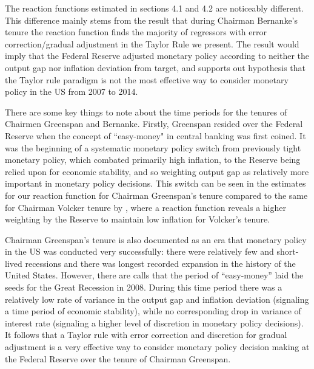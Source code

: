 \documentclass[notitlepage,12pt]{article}
\begin{document}
The reaction functions estimated in sections 4.1 and 4.2 are noticeably different.  This difference mainly stems from the result that during Chairman Bernanke's tenure the reaction function finds the majority of regressors  with error correction/gradual adjustment in the Taylor Rule we present.  The result would imply that the Federal Reserve adjusted monetary policy according to neither the output gap nor inflation deviation from target, and supports out hypothesis that the Taylor rule paradigm is not the most effective way to consider monetary policy in the US from 2007 to 2014.

There are some key things to note about the time periods for the tenures of Chairmen Greenspan and Bernanke.  Firstly, Greenspan resided over the Federal Reserve when the concept of ``easy-money" in central banking was first coined.  It was the beginning of a systematic monetary policy switch from previously tight monetary policy, which combated primarily high inflation, to the Reserve being relied upon for economic stability, and so weighting output gap as relatively more important in monetary policy decisions.  This switch can be seen in the estimates for our reaction function for Chairman Greenspan's tenure compared to the same for Chairman Volcker tenure by \cite{judd1998taylor}, where a reaction function reveals a higher weighting by the Reserve to maintain low inflation for Volcker's tenure.

Chairman Greenspan's tenure is also documented as an era that monetary policy in the US was conducted very successfully: there were relatively few and short-lived recessions and there was longest recorded expansion in the history of the United States.  However, there are calls that the period of ``easy-money'' laid the seeds for the Great Recession in 2008.  During this time period there was a relatively low rate of variance in the output gap and inflation deviation (signaling a time period of economic stability), while no corresponding drop in variance of interest rate (signaling a higher level of discretion in monetary policy decisions).  It follows that a Taylor rule with error correction and discretion for gradual adjustment is a very effective way to consider monetary policy decision making at the Federal Reserve over the tenure of Chairman Greenspan.
\end{document}
